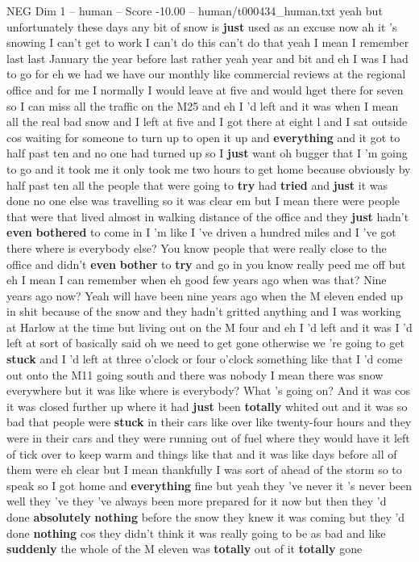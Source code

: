 \begin{textsample}{NEG Dim 1 – human – Score -10.00 – human/t000434\_human.txt}  \label{ex:f1_neg_031}
yeah but unfortunately these days any bit of snow is \textbf{just} used as an excuse now ah it 's snowing I can't get to work I can't do this can't do that yeah I mean I remember last last January the year before last rather yeah year and bit and eh I was I had to go for eh we had we have our monthly like commercial reviews at the regional office and for me I normally I would leave at five and would hget there for seven so I can miss all the traffic on the M25 and eh I 'd left and it was when I mean all the real bad snow and I left at five and I got there at eight l and I sat outside cos waiting for someone to turn up to open it up and \textbf{everything} and it got to half past ten and no one had turned up so I \textbf{just} want oh bugger that I 'm going to go and it took me it only took me two hours to get home because obviously by half past ten all the people that were going to \textbf{try} had \textbf{tried} and \textbf{just} it was done no one else was travelling so it was clear em but I mean there were people that were that lived almost in walking distance of the office and they \textbf{just} hadn't \textbf{even} \textbf{bothered} to come in I 'm like I 've driven a hundred miles and I 've got there where is everybody else?
You know people that were really close to the office and didn't \textbf{even} \textbf{bother} to \textbf{try} and go in you know really peed me off but eh I mean I can remember when eh good few years ago when was that?
Nine years ago now?
Yeah will have been nine years ago when the M eleven ended up in shit because of the snow and they hadn't gritted anything and I was working at Harlow at the time but living out on the M four and eh I 'd left and it was I 'd left at sort of basically said oh we need to get gone otherwise we 're going to get \textbf{stuck} and I 'd left at three o'clock or four o'clock something like that I 'd come out onto the M11 going south and there was nobody I mean there was snow everywhere but it was like where is everybody?
What 's going on?
And it was cos it was closed further up where it had \textbf{just} been \textbf{totally} whited out and it was so bad that people were \textbf{stuck} in their cars like over like twenty-four hours and they were in their cars and they were running out of fuel where they would have it left of tick over to keep warm and things like that and it was like days before all of them were eh clear but I mean thankfully I was sort of ahead of the storm so to speak so I got home and \textbf{everything} fine but yeah they 've never it 's never been well they 've they 've always been more prepared for it now but then they 'd done \textbf{absolutely} \textbf{nothing} before the snow they knew it was coming but they 'd done \textbf{nothing} cos they didn't think it was really going to be as bad and like \textbf{suddenly} the whole of the M eleven was \textbf{totally} out of it \textbf{totally} gone

\end{textsample}
